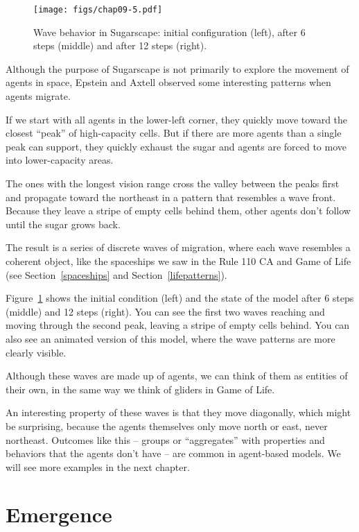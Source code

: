\documentclass[12pt]{book}
\theoremstyle{exercise}
\begin{document}
\begin{figure}
\centerline{\texttt{[image: figs/chap09-5.pdf]}}
\caption{Wave behavior in Sugarscape: initial configuration (left),
after 6 steps (middle) and after 12 steps (right). }
\label{chap09-5}
\end{figure}

Although the purpose of Sugarscape is not primarily to explore the
movement of agents in space, Epstein and Axtell observed some
interesting patterns when agents migrate.

If we start with all agents in the lower-left corner, they quickly move
toward the closest ``peak'' of high-capacity cells.  But if there
are more agents than a single peak can support, they quickly exhaust
the sugar and agents are forced to move into lower-capacity areas.

The ones with the longest vision range cross the valley between the
peaks first and propagate toward the northeast in a pattern that
resembles a wave front.  Because they leave a stripe of empty cells
behind them, other agents don't follow until the sugar grows back.

The result is a series of discrete waves of migration, where each wave
resembles a coherent object, like the spaceships we saw in the Rule
110 CA and Game of Life (see Section~\ref{spaceships} and
Section~\ref{lifepatterns}).

Figure~\ref{chap09-5} shows the initial condition (left) and the
state of the model after 6 steps (middle) and 12 steps (right).
You can see the first two waves reaching and moving through the
second peak, leaving a stripe of empty cells behind.  You can also
see an animated version of this model, where the wave patterns are
more clearly visible.

Although these waves are made up of agents, we can think of them
as entities of their own, in the same way we think of gliders in
Game of Life.

An interesting property of these waves is that they
move diagonally, which might be surprising, because the agents
themselves only move north or east, never northeast.  Outcomes
like this -- groups or ``aggregates'' with properties and behaviors
that the agents don't have -- are common in agent-based models.
We will see more examples in the next chapter.


\section{Emergence}
\end{document}
